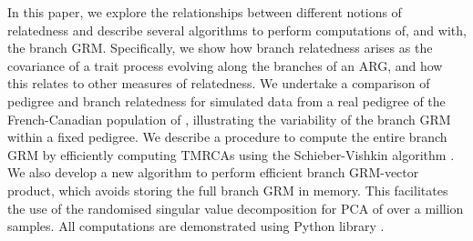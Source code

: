 In this paper, we explore the relationships between different notions of relatedness and
describe several algorithms to perform computations of, and with, the branch GRM.
%
Specifically, we show how branch relatedness arises as
the covariance of a trait process evolving along the branches of an ARG, and how this relates to other measures of relatedness.
%
We undertake a comparison of pedigree and branch relatedness
for simulated data from a real pedigree of the French-Canadian population of
\citet{andersontrocme2023genes},
illustrating the variability of the branch GRM within a fixed pedigree.
%
We describe a procedure to compute the entire branch GRM by efficiently computing TMRCAs
using the Schieber-Vishkin algorithm \citep{Schieber1988On}.
%
We also develop a new algorithm to perform efficient branch GRM-vector product,
which avoids storing the full branch GRM in memory.
%
This facilitates the use of the randomised singular value decomposition \citep{halko2011findingstructure}
for PCA of over a million samples.
%
All computations are demonstrated using Python \tskit{} library
\citep{ralph2020efficiently, kelleher2024tskit}.
